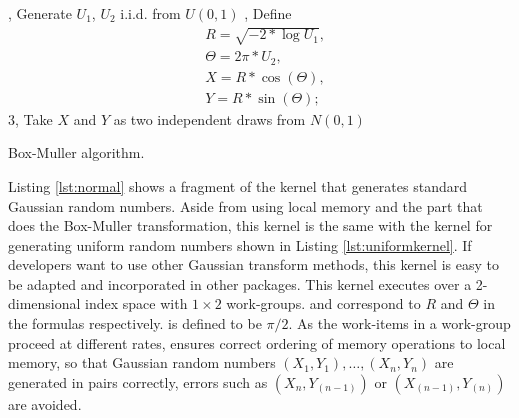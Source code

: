 \documentclass[article,nojss]{jss}\usepackage[]{graphicx}\usepackage[]{color}
\begin{document}
\begin{algorithm}[ht] 
, Generate $U_1$, $U_2$ i.i.d. from $U (0,1)$ , Define \begin{align*} 
& R = \sqrt{-2*\log U_1},\\
&  \Theta = 2\pi*U_2,\\
&  X=R*\cos(\Theta),\\
& Y=R*\sin(\Theta);\;\end{align*}
 3, Take $X$ and $Y$ as two independent draws from $N(0,1)$\;
 \caption{Box-Muller algorithm.}
 \label{algorithm1}
\end{algorithm}


Listing \ref{lst:normal} shows a fragment of the kernel that generates standard Gaussian random numbers. Aside from using local memory and the part that does the Box-Muller transformation, this kernel is the same with the kernel for generating uniform random numbers shown in Listing \ref{lst:uniformkernel}. If developers want to use other Gaussian transform methods, this kernel is easy to be adapted and incorporated in other  packages. This kernel executes over a 2-dimensional index space with $1 \times 2$ work-groups.  and  correspond to $R$ and $\Theta$ in the formulas respectively.  is defined to be $\pi/2$. As the work-items in a work-group proceed at different rates,  ensures correct ordering of memory operations to local memory, so that Gaussian random numbers $(X_1,Y_1), \dots, (X_n,Y_n)$ are generated in pairs correctly, errors such as $(X_n, Y_{(n-1)})$ or $(X_{(n-1)}, Y_{(n)})$ are avoided.
%
\end{document}
